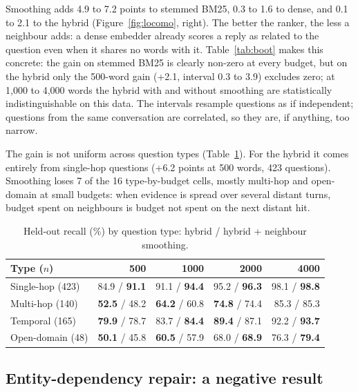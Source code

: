 \documentclass[11pt]{article}
\begin{document}
Smoothing adds 4.9 to 7.2 points to stemmed BM25, 0.3 to 1.6 to dense, and 0.1 to 2.1 to the
hybrid (Figure~\ref{fig:locomo}, right). The better the ranker, the less a neighbour adds:
a dense embedder already scores a reply as related to the question even when it shares no
words with it. Table~\ref{tab:boot} makes this concrete: the gain on stemmed BM25 is clearly
non-zero at every budget, but on the hybrid only the 500-word gain (+2.1, interval 0.3 to 3.9)
excludes zero; at 1,000 to 4,000 words the hybrid with and without smoothing are statistically
indistinguishable on this data. The intervals resample questions as if independent; questions
from the same conversation are correlated, so they are, if anything, too narrow.

The gain is not uniform across question types (Table~\ref{tab:cats}). For the hybrid it comes
entirely from single-hop questions (+6.2 points at 500 words, 423 questions). Smoothing loses 7
of the 16 type-by-budget cells, mostly multi-hop and open-domain at small budgets: when evidence
is spread over several distant turns, budget spent on neighbours is budget not spent on the
next distant hit.

\begin{table}[t]
  \centering
  \small
  \begin{tabular}{lrrrr}
    \toprule
    Type ($n$) & 500 & 1000 & 2000 & 4000 \\
    \midrule
    Single-hop (423)  & 84.9 / \textbf{91.1} & 91.1 / \textbf{94.4} & 95.2 / \textbf{96.3} & 98.1 / \textbf{98.8} \\
    Multi-hop (140)   & \textbf{52.5} / 48.2 & \textbf{64.2} / 60.8 & \textbf{74.8} / 74.4 & 85.3 / 85.3 \\
    Temporal (165)    & \textbf{79.9} / 78.7 & 83.7 / \textbf{84.4} & \textbf{89.4} / 87.1 & 92.2 / \textbf{93.7} \\
    Open-domain (48)  & \textbf{50.1} / 45.8 & \textbf{60.5} / 57.9 & 68.0 / \textbf{68.9} & 76.3 / \textbf{79.4} \\
    \bottomrule
  \end{tabular}
  \caption{Held-out recall (\%) by question type: hybrid / hybrid + neighbour smoothing.}
  \label{tab:cats}
\end{table}

\subsection{Entity-dependency repair: a negative result}
\end{document}
